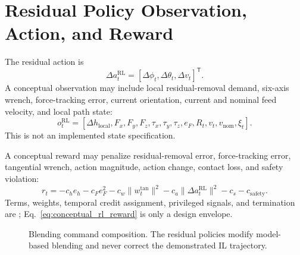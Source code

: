 \section{Residual Policy Observation, Action, and Reward}
The residual action is
\begin{equation}
  \Delta a_t^{\mathrm{RL}}
  =
  [\Delta\phi_t,\Delta\theta_t,\Delta v_t]^\mathsf{T}.
  \label{eq:residual_action}
\end{equation}
A conceptual observation may include local residual-removal demand, six-axis wrench, force-tracking error, current orientation, current and nominal feed velocity, and local path state:
\begin{equation}
  o_t^{\mathrm{RL}}
  =
  [\Delta h_{\mathrm{local}},F_x,F_y,F_z,\tau_x,\tau_y,\tau_z,
  e_F,R_t,v_t,v_{\mathrm{nom}},\xi_t].
  \label{eq:residual_observation}
\end{equation}
This is not an implemented state specification. 

A conceptual reward may penalize residual-removal error, force-tracking error, tangential wrench, action magnitude, action change, contact loss, and safety violation:
\begin{equation}
  r_t =
  -c_h e_h
  -c_F e_F^2
  -c_w\|w_t^{\mathrm{tan}}\|^2
  -c_a\|\Delta a_t^{\mathrm{RL}}\|^2
  -c_s
  -c_{\mathrm{safety}}.
  \label{eq:conceptual_rl_reward}
\end{equation}
Terms, weights, temporal credit assignment, privileged signals, and termination are ; Eq.~\eqref{eq:conceptual_rl_reward} is only a design envelope.

\begin{figure}[t]
  \centering
  \caption{Blending command composition. The residual policies modify model-based blending and never correct the demonstrated IL trajectory.}
  \label{fig:blending_command}
\end{figure}

